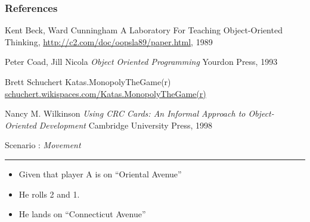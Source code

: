 \documentclass[handout,t,12pt]{beamer}
\newcommand{\Square}[1]{``#1''}
\newcounter{scenarioid}\setcounter{scenarioid}{0}
\newenvironment{scenario}[1]{%
\addtocounter{scenarioid}{1} 
{\Large Scenario \thescenarioid: \emph{#1}\\[3px]\hrule}
\vspace{1\bigskipamount}
}{%
}
\begin{document}
  \begin{frame}\frametitle{References}
      \begin{thebibliography}{10}
        
          Kent Beck, Ward Cunningham
          \newblock A Laboratory For Teaching Object-Oriented Thinking,
          \newblock \url{http://c2.com/doc/oopsla89/paper.html}, 1989

          
        Peter Coad, Jill Nicola
        \newblock\emph{Object Oriented Programming}
        \newblock Yourdon Press, 1993
        
          Brett Schuchert
          \newblock Katas.MonopolyTheGame(r)
          \newblock \url{schuchert.wikispaces.com/Katas.MonopolyTheGame(r)}

          Nancy M. Wilkinson
          \newblock \emph{Using CRC Cards: An Informal Approach to Object-Oriented Development}
          \newblock Cambridge University Press, 1998
        
        
    \end{thebibliography}
  \end{frame}

  
  \begin{frame}
    \begin{scenario}{Movement}
      \begin{itemize}
        \item Given that player A is on \Square{Oriental Avenue}
        \item He rolls 2 and 1.  
        \item He lands on \Square{Connecticut Avenue}
      \end{itemize}      
    \end{scenario}
  \end{frame}
\end{document}
